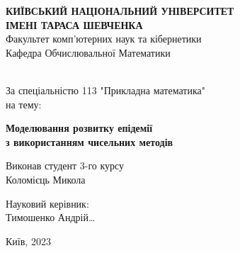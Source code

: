 \begin{titlepage}
    \begin{center}
        \large \textbf{КИЇВСЬКИЙ НАЦІОНАЛЬНИЙ УНІВЕРСИТЕТ \\
            ІМЕНІ ТАРАСА ШЕВЧЕНКА} \\

        \vspace{0.5cm}
        Факультет комп’ютерних наук та кібернетики \\
        Кафедра Обчислювальної Математики
        \vspace{2.5cm}
        \vfill

        \\[2mm]

        За спеціальністю 113 "Прикладна математика" \\
        на тему:

        \vfill

        {\LARGE \textbf{Моделювання розвитку епідемії \\
                з використанням чисельних методів}}
        \bigskip
        \vspace{6cm}

    \end{center}
    \vfill

    \newlength{\ML}
    \settowidth{\ML}{}
    \begin{minipage}{0.5\textwidth}
        Виконав студент 3-го курсу \\
        Коломієць Микола
    \end{minipage}%
    \bigskip

    \begin{minipage}{0.5\textwidth}
        Науковий керівник:\\
        Тимошенко Андрій…
    \end{minipage}%
    \vfill

    \vspace{2cm}

    \begin{center}
        Київ, 2023
    \end{center}

\end{titlepage}

